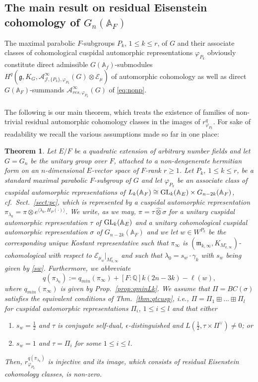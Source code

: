 \documentclass[a4paper,10pt]{amsart}
\newtheorem{thm}[equation]{Theorem}
\theoremstyle{definition}
\numberwithin{equation}{section}
\def\A{\mathbb A}
\def\Q{\mathbb Q}
\def\EE{\mathcal E}
\def\g{\mathfrak g}
\def\m{\mathfrak m}
\def\GL{{\rm GL}}
\begin{document}
\subsection{The main result on residual Eisenstein cohomology of $G_n(\A_F)$}
The maximal parabolic $F$-subgroups $P_k$, $1\leq k\leq r$, of $G$ and their associate classes of cohomological cuspidal automorphic representations $\varphi_{P_k}$ obviously constitute direct admissible $G(\A_f)$-submodules $H^q(\g,K_G, \mathcal A^\infty_{\mathcal J,\{P_k\},\varphi_{P_k}}(G)\otimes\EE_\mu)$ of automorphic cohomology as well as direct $G(\A_F)$-summands $\mathcal A^\infty_{res,\varphi_{P_k}}(G)$ of \eqref{eq:nonp}.\\\\ The following is our main theorem, which treats the existence of families of non-trivial residual automorphic cohomology classes in the images of $r^q_{\varphi_{P_k}}$. For sake of readability we recall the various assumptions made so far in one place:




\begin{thm}\label{thm:main}
Let $E/F$ be a quadratic extension of arbitrary number fields and let $G=G_n$ be the unitary group over $F$, attached to a non-dengenerate hermitian form on an $n$-dimensional $E$-vector space of $F$-rank $r\geq 1$. Let $P_k$, $1\leq k\leq r$, be a standard maximal parabolic $F$-subgroup of $G$ and let $\varphi_{P_k} $ be an associate class of cuspidal automorphic representations of $L_k(\A_F)\cong \GL_k(\A_E)\times G_{n-2k}(\A_F)$, cf.\ Sect.\ \ref{sect:pc}, which is represented by a cuspidal automorphic representation $\pi_{\lambda_0}=\pi\otimes e^{\langle \lambda_0, H_P(\cdot)\rangle}$. We write, as we may, $\pi=\tau\hat\otimes\sigma$ for a unitary cuspidal automorphic representation $\tau$ of $\GL_k(\A_E)$ and a unitary cohomological cuspidal automorphic representation $\sigma$ of $G_{n-2k}(\A_F)$ and we let  $w\in W^{P_k}$ be the corresponding unique Kostant representative such that $\pi_\infty$ is $(\m_{k,\infty},K_{M^\circ_{k,\infty}})$-cohomological with respect to $\EE_{\mu_w}|_{M^\circ_{k,\infty}}$ and such that $\lambda_0=s_w\cdot \gamma_k$ with $s_w$ being given by \eqref{sw}. Furthermore, we abbreviate
$$q(\pi_{\lambda_0}):=q_{min}(\pi_\infty) + [F:\Q] k(2n-3k) -\ell(w),$$
where $q_{min}(\pi_\infty)$ is given by Prop.\ \ref{prop:qminLk}.
We assume that $\Pi=BC(\sigma)$ satisfies the equivalent conditions of Thm.\ \ref{thm:qtcusp}, i.e., $\Pi=\Pi_1\boxplus...\boxplus\Pi_l$ for cuspidal automorphic representations $\Pi_i$, $1\leq i\leq l$ and that either
\begin{enumerate}
\item $s_w=\tfrac12$ and $\tau$ is conjugate self-dual, $\epsilon$-distinguished and $L(\tfrac12,\tau\times \Pi^\vee)\neq 0$; or
\item $s_w=1$ and $\tau=\Pi_i$ for some $1\leq i\leq l$.
\end{enumerate}
Then, $r^{q(\pi_{\lambda_0})}_{\varphi_{P_k}}$ is injective and its image, which consists of residual Eisenstein cohomology classes, is non-zero.
\end{thm}
\end{document}
